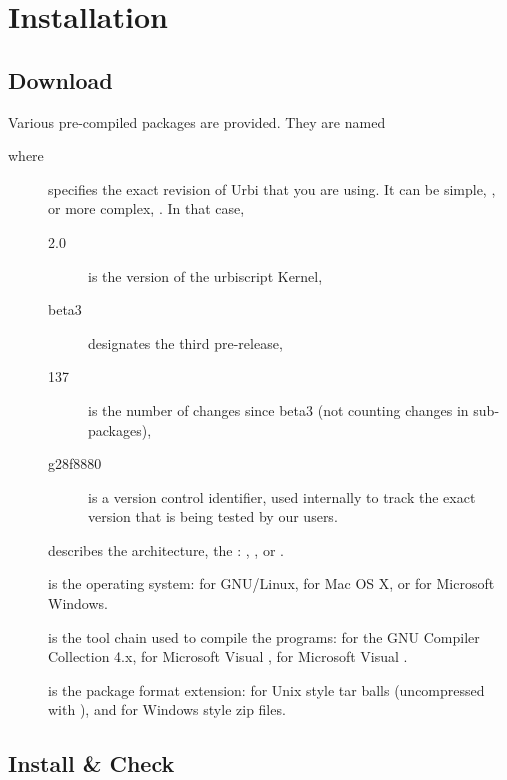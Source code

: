 \chapter{Installation}
\label{sec:installation}

\section{Download}

Various pre-compiled packages are provided.  They are named
\begin{center}
\end{center}
where
\begin{description}
\item[] specifies the exact revision of Urbi that you are
  using.  It can be simple, , or more complex,
  .  In that case,
  \begin{description}
  \item[2.0] is the version of the urbiscript Kernel,
  \item[beta3] designates the third pre-release,
  \item[137] is the number of changes since beta3 (not counting
    changes in sub-packages),
  \item[g28f8880] is a version control identifier, used internally to
    track the exact version that is being tested by our users.
  \end{description}
\item[] describes the architecture, the :
  , , or .
\item[] is the operating system:  for GNU/Linux,
   for Mac OS X, or  for Microsoft Windows.
\item[] is the tool chain used to compile the programs:
   for the GNU Compiler Collection 4.x,  for
  Microsoft Visual ,  for Microsoft Visual
  .
\item[] is the package format extension:  for
  Unix style tar balls (uncompressed with ), and  for Windows style zip files.
\end{description}

\section{Install \&{} Check}
\label{sec:install:install}

